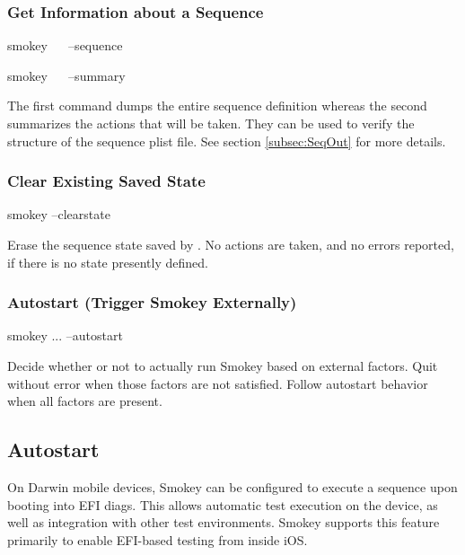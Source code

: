 \subsubsection{Get Information about a Sequence}

\begin{CommandLine}
smokey ~~ --sequence
\end{CommandLine}

\begin{CommandLine}
smokey ~~ --summary
\end{CommandLine}

The first command dumps the entire sequence definition whereas the second
summarizes the actions that will be taken.  They can be used to verify the
structure of the sequence plist file.  See section \ref{subsec:SeqOut} for more
details.

\subsubsection{Clear Existing Saved State}

\begin{CommandLine}
smokey --clearstate
\end{CommandLine}

Erase the sequence state saved by .  No actions are
taken, and no errors reported, if there is no state presently defined.

\subsubsection{Autostart (Trigger Smokey Externally)}

\begin{CommandLine}
smokey ... --autostart
\end{CommandLine}

Decide whether or not to actually run Smokey based on external factors.  Quit
without error when those factors are not satisfied.  Follow autostart behavior
when all factors are present.

\subsection{Autostart}

On Darwin mobile devices, Smokey can be configured to execute a sequence upon
booting into EFI diags.  This allows automatic test execution on the device, as
well as integration with other test environments.  Smokey supports this feature
primarily to enable EFI-based testing from inside iOS.

